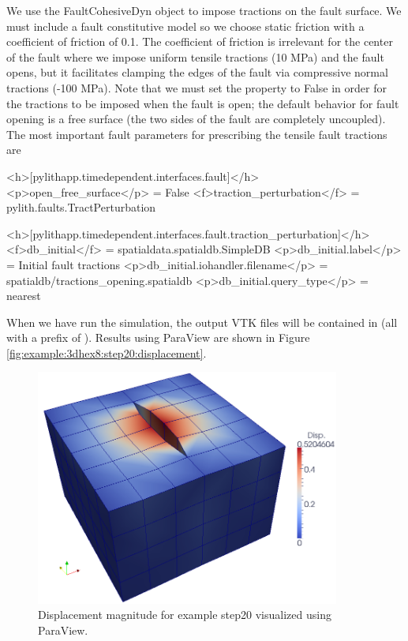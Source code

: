 We use the FaultCohesiveDyn object to impose tractions on the fault
surface. We must include a fault constitutive model so we choose static
friction with a coefficient of friction of 0.1. The coefficient of
friction is irrelevant for the center of the fault where we impose
uniform tensile tractions (10 MPa) and the fault opens, but it facilitates
clamping the edges of the fault via compressive normal tractions (-100
MPa). Note that we must set the property 
to False in order for the tractions to be imposed when the fault is
open; the default behavior for fault opening is a free surface (the
two sides of the fault are completely uncoupled). The most important
fault parameters for prescribing the tensile fault tractions are
\begin{cfg}
<h>[pylithapp.timedependent.interfaces.fault]</h>
<p>open_free_surface</p> = False
<f>traction_perturbation</f> = pylith.faults.TractPerturbation

<h>[pylithapp.timedependent.interfaces.fault.traction_perturbation]</h>
<f>db_initial</f> = spatialdata.spatialdb.SimpleDB
<p>db_initial.label</p> = Initial fault tractions
<p>db_initial.iohandler.filename</p> = spatialdb/tractions_opening.spatialdb
<p>db_initial.query_type</p> = nearest 
\end{cfg}
When we have run the simulation, the output VTK files will be contained
in  (all with a prefix of ).
Results using ParaView are shown in Figure \vref{fig:example:3dhex8:step20:displacement}.

\begin{figure}
  \includegraphics[width=10cm]{examples/figs/3dhex8_step20_disp}
  \caption{Displacement magnitude for example step20 visualized using ParaView.}
  \label{fig:example:3dhex8:step20:displacement}
\end{figure}


